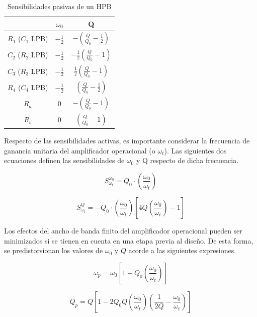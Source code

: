 \begin{table}[H]
    \centering
    \begin{tabular}{c | c c}
         & $\omega_0$ & Q\\
        \hline
        $R_1$ ($C_1$ LPB) & $-\frac{1}{2}$ & $-\left(\frac{Q}{Q_0} - \frac{1}{2} \right)$ \\
        $C_2$ ($R_2$ LPB) & $-\frac{1}{2}$ & $-\frac{1}{2}\left(\frac{Q}{Q_0} - 1 \right)$ \\
        $C_3$ ($R_3$ LPB) & $-\frac{1}{2}$ & $\frac{1}{2}\left(\frac{Q}{Q_0} - 1 \right)$\\
        $R_4$ ($C_4$ LPB) & $-\frac{1}{2}$ & $\left(\frac{Q}{Q_0} - \frac{1}{2} \right)$ \\
        $R_a$  & $0$ & $-\left(\frac{Q}{Q_0} - 1 \right)$\\
        $R_b$  & $0$ & $\left(\frac{Q}{Q_0} - 1 \right)$\\
    \end{tabular}
    \caption{Sensibilidades pasivas de un HPB}
    \label{tabla_sensibilidades_pasivas}
\end{table}

Respecto de las sensibilidades activas, es importante considerar la frecuencia de ganancia unitaria del amplificador operacional (o $\omega_t$). Las siguientes dos ecuaciones definen las sensibilidades de $\omega_0$ y Q respecto de dicha frecuencia.

\begin{equation}
S_{\omega_t}^{\omega_0} = Q_0 \cdot \left(\frac{\omega_0}{\omega_t}\right)
\end{equation}

\begin{equation}
S_{\omega_t}^{Q} = -Q_0 \cdot \left(\frac{\omega_0}{\omega_t}\right) \left[ 4Q\left(\frac{\omega_0}{\omega_t}\right) - 1\right]
\end{equation}

Los efectos del ancho de banda finito del amplificador operacional pueden ser minimizados si se tienen en cuenta en una etapa previa al dise\~no. De esta forma, se predistorsionan los valores de $\omega_0$ y $Q$ acorde a las siguientes expresiones.

\begin{equation}
\label{omega_predistortion}
\omega_p = \omega_0 \left[ 1+Q_0\left(\frac{\omega_0}{\omega_t}\right)\right]
\end{equation}

\begin{equation}
\label{q_predistortion}
Q_p = Q \left[ 1-2Q_0Q\left(\frac{\omega_0}{\omega_t}\right)\left(\frac{1}{2Q}-\frac{\omega_0}{\omega_t}\right)\right]
\end{equation}

